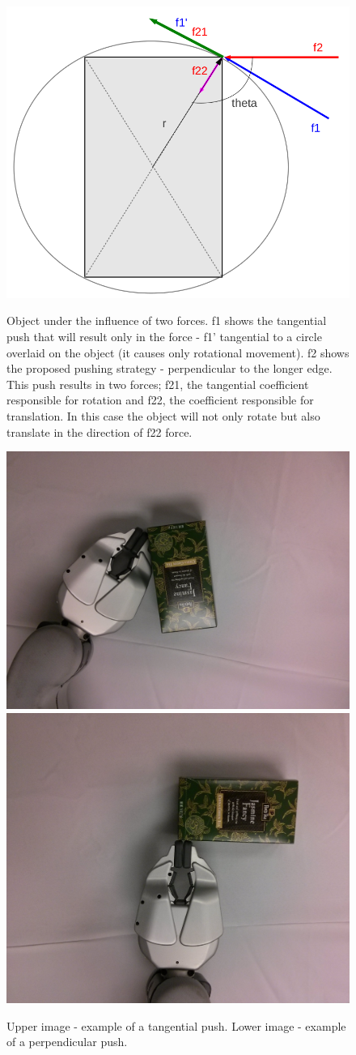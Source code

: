 \begin{figure}
\centering 

\includegraphics[width=0.5\columnwidth]{figures/rectangle-angle.png}\\


\caption{Object under the influence of two forces. f1 shows the tangential push that will result only in the force - f1' tangential to a circle overlaid on the object (it causes only rotational movement). f2 shows the proposed pushing strategy - perpendicular to the longer edge. This push results in two forces; f21, the tangential coefficient responsible for rotation and f22, the coefficient responsible for translation. In this case the object will not only rotate but also translate in the direction of f22 force.  }
\label{fig:angles-rectangle}
\end{figure}




\begin{figure}
\centering 

\includegraphics[width=0.4\columnwidth]{figures/peets-tangential.jpg}\\
\includegraphics[width=0.4\columnwidth]{figures/peets-perpendicular.jpg}\\


\caption{Upper image - example of a tangential push. Lower image - example of a perpendicular push.}
\label{fig:tangential-example}
\end{figure}

